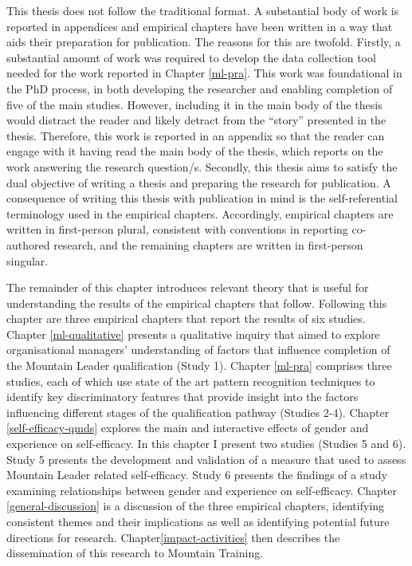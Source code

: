\documentclass[
  12pt,
  a4paper,
]{book}
\begin{document}
This thesis does not follow the traditional format. A substantial body of work is reported in appendices and empirical chapters have been written in a way that aids their preparation for publication. The reasons for this are twofold. Firstly, a substantial amount of work was required to develop the data collection tool needed for the work reported in Chapter \ref{ml-pra}. This work was foundational in the PhD process, in both developing the researcher and enabling completion of five of the main studies. However, including it in the main body of the thesis would distract the reader and likely detract from the ``story'' presented in the thesis. Therefore, this work is reported in an appendix so that the reader can engage with it having read the main body of the thesis, which reports on the work answering the research question/s. Secondly, this thesis aims to satisfy the dual objective of writing a thesis and preparing the research for publication. A consequence of writing this thesis with publication in mind is the self-referential terminology used in the empirical chapters. Accordingly, empirical chapters are written in first-person plural, consistent with conventions in reporting co-authored research, and the remaining chapters are written in first-person singular.

The remainder of this chapter introduces relevant theory that is useful for understanding the results of the empirical chapters that follow. Following this chapter are three empirical chapters that report the results of six studies.
Chapter \ref{ml-qualitative} presents a qualitative inquiry that aimed to explore organisational managers' understanding of factors that influence completion of the Mountain Leader qualification (Study 1).
Chapter \ref{ml-pra} comprises three studies, each of which use state of the art pattern recognition techniques to identify key discriminatory features that provide insight into the factors influencing different stages of the qualification pathway (Studies 2-4).
Chapter \ref{self-efficacy-qmds} explores the main and interactive effects of gender and experience on self-efficacy. In this chapter I present two studies (Studies 5 and 6). Study 5 presents the development and validation of a measure that used to assess Mountain Leader related self-efficacy. Study 6 presents the findings of a study examining relationships between gender and experience on self-efficacy.
Chapter \ref{general-discussion} is a discussion of the three empirical chapters, identifying consistent themes and their implications as well as identifying potential future directions for research.
Chapter\ref{impact-activities} then describes the dissemination of this research to Mountain Training.
\end{document}
